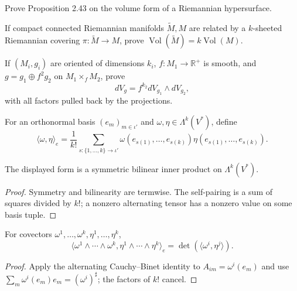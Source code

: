 \begin{exercise}
\label{prob:hypersurface-volume-form}
\leanok
{}
Prove Proposition 2.43 on the volume form of a Riemannian hypersurface.
\end{exercise}

\begin{exercise}
\label{prob:covering-volume-form}
If compact connected Riemannian manifolds $\widetilde M,M$ are related by a $k$-sheeted Riemannian covering $\pi:\widetilde M\to M$, prove $\operatorname{Vol}(\widetilde M)=k\operatorname{Vol}(M)$.
\end{exercise}

\begin{exercise}
\label{prob:warped-product-volume-form}
If $(M_i,g_i)$ are oriented of dimensions $k_i$, $f:M_1\to\mathbb R^+$ is smooth, and $g=g_1\oplus f^2g_2$ on $M_1\times_fM_2$, prove
\[
dV_g=f^{k_2}dV_{g_1}\wedge dV_{g_2},
\]
with all factors pulled back by the projections.
\end{exercise}

\begin{definition}
\label{def:inner-k-covectors}
\leanok
For an orthonormal basis $(e_m)_{m\in\iota'}$ and $\omega,\eta\in\Lambda^k(V^*)$, define
\[
\langle\omega,\eta\rangle_e=\frac1{k!}\sum_{s:\{1,\ldots,k\}\to\iota'}\omega(e_{s(1)},\ldots,e_{s(k)})\eta(e_{s(1)},\ldots,e_{s(k)}).
\]
\end{definition}

\begin{lemma}
\label{lem:inner-k-covectors-posdef}
\leanok
{}
The displayed form is a symmetric bilinear inner product on $\Lambda^k(V^*)$.
\end{lemma}
\begin{proof}
\leanok
\sketch Symmetry and bilinearity are termwise. The self-pairing is a sum of squares divided by $k!$; a nonzero alternating tensor has a nonzero value on some basis tuple.
\end{proof}

\begin{lemma}
\label{lem:inner-k-covectors-wedge}
\leanok
{}
For covectors $\omega^1,\ldots,\omega^k,\eta^1,\ldots,\eta^k$,
\[
\langle\omega^1\wedge\cdots\wedge\omega^k,\eta^1\wedge\cdots\wedge\eta^k\rangle_e=\det(\langle\omega^i,\eta^j\rangle).
\]
\end{lemma}
\begin{proof}
\leanok
{}
\sketch Apply the alternating Cauchy--Binet identity to $A_{im}=\omega^i(e_m)$ and use $\sum_m\omega^i(e_m)e_m=(\omega^i)^\sharp$; the factors of $k!$ cancel.
\end{proof}

